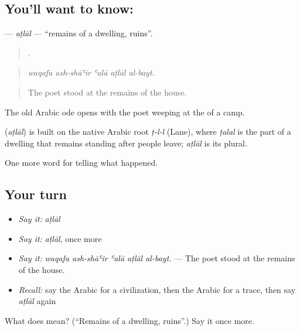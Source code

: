 \subsection*{You'll want to know: }
\textbf{} — \emph{aṭlāl} — \textquotedblleft{}remains of a dwelling, ruins\textquotedblright{}.

\begin{quote}
    .
\end{quote}

\begin{quote}
\emph{waqafa ash-shāʿir ʿalā aṭlāl al-bayt.}
\end{quote}

\begin{quote}
The poet stood at the remains of the house.
\end{quote}

The old Arabic ode opens with the poet weeping at the  of a camp.

\begin{cousinweb}
\textbf{} (\emph{aṭlāl}) is built on the native Arabic root \emph{ṭ-l-l} (Lane), where \emph{ṭalal} is the part of a dwelling that remains standing after people leave; \emph{aṭlāl} is its plural.
\end{cousinweb}

\begin{grammarlens}[title={What you've built}]
One more word for telling what happened.
\end{grammarlens}

\subsection*{Your turn}
\begin{itemize}
\raggedright
  \item \emph{Say it:} \emph{aṭlāl}
  \item \emph{Say it:} \emph{aṭlāl}, once more
  \item \emph{Say it:} \emph{waqafa ash-shāʿir ʿalā aṭlāl al-bayt.} — The poet stood at the remains of the house.
  \item \emph{Recall:} say the Arabic for a civilization, then the Arabic for a trace, then say \emph{aṭlāl} again
\end{itemize}

\begin{tcolorbox}[breakable,colback=teal!4,colframe=teal!35!black,title={Before you move on}]
What does  mean? (\textquotedblleft{}Remains of a dwelling, ruins\textquotedblright{}.) Say it once more.
\end{tcolorbox}
